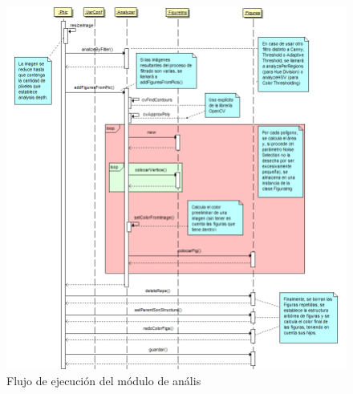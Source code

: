 		\begin{figure}[htbp]
		\centering
		\includegraphics[scale=0.47]{graphics/diagramaflujoPHIC2.png}
		\caption{Flujo de ejecución del módulo de anális}
		\label{fig:diagramaflujoPHIC2}
		\end{figure}